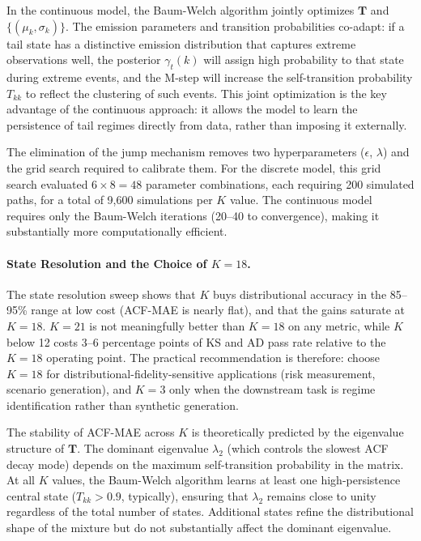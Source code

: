 In the continuous model, the Baum-Welch algorithm jointly optimizes $\mathbf{T}$ and $\{(\mu_k, \sigma_k)\}$.
The emission parameters and transition probabilities co-adapt: if a tail state has a distinctive emission distribution that captures extreme observations well, the posterior $\gamma_t(k)$ will assign high probability to that state during extreme events, and the M-step will increase the self-transition probability $T_{kk}$ to reflect the clustering of such events.
This joint optimization is the key advantage of the continuous approach: it allows the model to learn the persistence of tail regimes directly from data, rather than imposing it externally.

The elimination of the jump mechanism removes two hyperparameters ($\epsilon$, $\lambda$) and the grid search required to calibrate them.
For the discrete model, this grid search evaluated $6 \times 8 = 48$ parameter combinations, each requiring 200 simulated paths, for a total of 9{,}600 simulations per $K$ value.
The continuous model requires only the Baum-Welch iterations (20--40 to convergence), making it substantially more computationally efficient.

\paragraph{State Resolution and the Choice of $K = 18$.}
The state resolution sweep shows that $K$ buys distributional accuracy in the 85--95\% range at low cost (ACF-MAE is nearly flat), and that the gains saturate at $K = 18$.
$K = 21$ is not meaningfully better than $K = 18$ on any metric, while $K$ below 12 costs 3--6 percentage points of KS and AD pass rate relative to the $K = 18$ operating point.
The practical recommendation is therefore: choose $K = 18$ for distributional-fidelity-sensitive applications (risk measurement, scenario generation), and $K = 3$ only when the downstream task is regime identification rather than synthetic generation.

The stability of ACF-MAE across $K$ is theoretically predicted by the eigenvalue structure of $\mathbf{T}$.
The dominant eigenvalue $\lambda_2$ (which controls the slowest ACF decay mode) depends on the maximum self-transition probability in the matrix.
At all $K$ values, the Baum-Welch algorithm learns at least one high-persistence central state ($T_{kk} > 0.9$, typically), ensuring that $\lambda_2$ remains close to unity regardless of the total number of states.
Additional states refine the distributional shape of the mixture but do not substantially affect the dominant eigenvalue.

